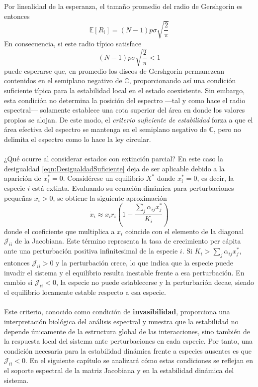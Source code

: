 Por linealidad de la esperanza, el tamaño promedio del radio de Gershgorin es entonces 
$$\mathbb{E}[R_i]=(N-1)p\sigma\sqrt{\frac{2}{\pi}}$$
En consecuencia, si este radio típico satisface 
\begin{equation}\label{eqn:CriterioDebil}
	(N-1)p\sigma\sqrt{\frac{2}{\pi}}<1
\end{equation}
puede esperarse que, en promedio los discos de Gershgorin permanezcan contenidos en el semiplano negativo de $\mathbb{C}$, proporcionando así una condición suficiente típica para la estabilidad local en el estado coexistente. Sin embargo, esta condición no determina la posición del espectro ---tal y como hace el radio espectral--- solamente establece una cota superior del área en donde los valores propios se alojan. De este modo, el \textit{criterio suficiente de estabilidad} forza a que el área efectiva del espectro se mantenga en el semiplano negativo de $\mathbb{C}$, pero no delimita el espectro como lo hace la ley circular.
\\
\\
¿Qué ocurre al considerar estados con extinción parcial? En este caso la desigualdad \eqref{eqn:DesigualdadSuficiente} deja de ser aplicable debido a la aparición de $x_i^*=0$. Considérese un equilibrio $X^*$ donde $x_i^*=0$, es decir, la especie $i$ está extinta. Evaluando su ecuación dinámica para perturbaciones pequeñas $x_i>0$, se obtiene la siguiente aproximación 
$$\dot{x}_i\approx x_ir_i\left (1-\frac{\sum_j\alpha_{ij}x_j^*}{K_i}\right )$$
donde el coeficiente que multiplica a $x_i$ coincide con el elemento de la diagonal $\mathcal{J}_{ii}$ de la Jacobiana. Este término representa la tasa de crecimiento per cápita ante una perturbación positiva infinitesimal de la especie $i$. Si $K_i>\sum_j\alpha_{ij}x_j^*$, entonces $\mathcal{J}_{ii}>0$ y la perturbación crece, lo que indica que la especie puede invadir el sistema y el equilibrio resulta inestable frente a esa perturbación. En cambio si $\mathcal{J}_{ii}<0$, la especie no puede establecerse y la perturbación decae, siendo el equilibrio locamente estable respecto a esa especie.\\
\\
Este criterio, conocido como condición de \textbf{invasibilidad}, proporciona una interpretación biológica del análisis espectral y muestra que la estabilidad no depende únicamente de la estructura global de las interacciones, sino también de la respuesta local del sistema ante perturbaciones en cada especie. Por tanto, una condición necesaria para la estabilidad dinámica frente a especies ausentes es que $\mathcal{J}_{ii}<0$. En el siguiente capítulo se analizará cómo estas condiciones se reflejan en el soporte espectral de la matriz Jacobiana y en la estabilidad dinámica del sistema.
